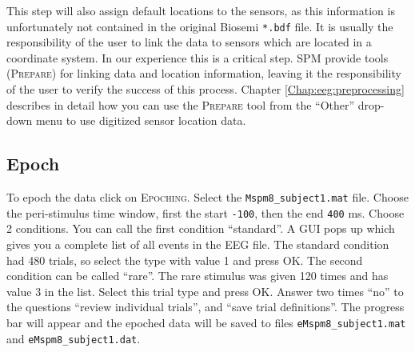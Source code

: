 This step will also assign default locations to the sensors, as this information is unfortunately not contained in the original Biosemi \texttt{*.bdf} file. It is usually the responsibility of the user to link the data to sensors which are located in a coordinate system. In our experience this is a critical step. SPM provide tools (\textsc{Prepare}) for linking data and location information, leaving it the responsibility of the user to verify the success of this process. Chapter \ref{Chap:eeg:preprocessing} describes in detail how you can use the \textsc{Prepare} tool from the ``Other'' drop-down menu to use digitized sensor location data.

\subsection{Epoch}
To epoch the data click on \textsc{Epoching}. Select the \texttt{Mspm8\_subject1.mat} file. Choose the peri-stimulus time window, first the start \texttt{-100}, then the end \texttt{400} ms. Choose 2 conditions. You can call the first condition ``standard''. A GUI pops up which gives you a complete list of all events in the EEG file. The standard condition had 480 trials, so select the type with value 1 and press OK. The second condition can be called ``rare''. The rare stimulus was given 120 times and has value 3 in the list. Select this trial type and press OK. Answer two times ``no'' to the questions  ``review individual trials'', and ``save trial definitions''. The progress bar will appear and the epoched data will be saved to files \texttt{eMspm8\_subject1.mat} and \texttt{eMspm8\_subject1.dat}.
